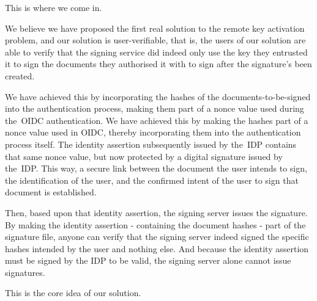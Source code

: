 This is where we come in.

We believe we have proposed the first real solution to the remote key activation problem,
and our solution is user-verifiable,
that is,
the users of our solution are able to verify that the signing service did indeed only use the key they entrusted it to sign the documents they authorised it with to sign after the signature's been created.

We have achieved this by incorporating the hashes of the documents-to-be-signed into the authentication process,
making them part of a nonce value used during the~\gls{OIDC} authentication.
We have achieved this by making the hashes part of a nonce value used in \gls{OIDC},
thereby incorporating them into the authentication process itself.
The identity assertion subsequently issued by the~\gls{IDP} contains that same nonce value,
but now protected by a digital signature issued by the~\gls{IDP}.
This way, a secure link between the document the user intends to sign,
the identification of the user,
and the confirmed intent of the user to sign that document is established.

Then, based upon that identity assertion, the signing server issues the signature.
By making the identity assertion - containing the document hashes - part of the signature file,
anyone can verify that the signing server indeed signed the specific hashes intended by the user and nothing else.
And because the identity assertion must be signed by the \gls{IDP} to be valid,
the signing server alone cannot issue signatures.

This is the core idea of our solution.
